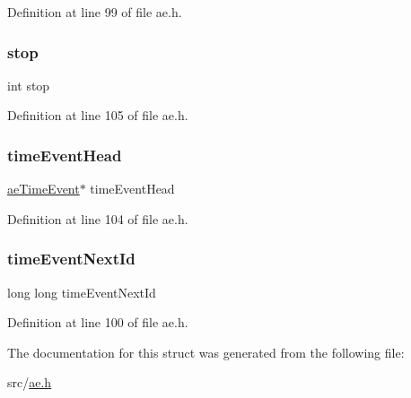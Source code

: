 Definition at line 99 of file ae.\+h.

\mbox{\label{structae_event_loop_a6c0af9f2e97842405fb15ed952ef2976}} 
\subsubsection{\texorpdfstring{stop}{stop}}
{\footnotesize\ttfamily int stop}



Definition at line 105 of file ae.\+h.

\mbox{\label{structae_event_loop_aa46c6a447db443855daf5b08923bed36}} 
\subsubsection{\texorpdfstring{time\+Event\+Head}{timeEventHead}}
{\footnotesize\ttfamily \hyperlink{structae_time_event}{ae\+Time\+Event}$\ast$ time\+Event\+Head}



Definition at line 104 of file ae.\+h.

\mbox{\label{structae_event_loop_a16573cf248b2aeb7ecacfc992ae774d4}} 
\subsubsection{\texorpdfstring{time\+Event\+Next\+Id}{timeEventNextId}}
{\footnotesize\ttfamily long long time\+Event\+Next\+Id}



Definition at line 100 of file ae.\+h.



The documentation for this struct was generated from the following file\+:\begin{DoxyCompactItemize}
\item 
src/\hyperlink{ae_8h}{ae.\+h}\end{DoxyCompactItemize}
